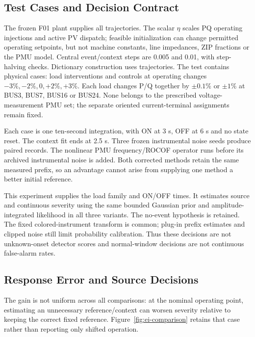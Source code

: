 \subsection{Test Cases and Decision Contract}
The frozen F01 plant supplies all trajectories. The scalar $\eta$ scales
PQ operating injections and active PV dispatch; feasible initialization
can change permitted operating setpoints, but not machine constants,
line impedances, ZIP fractions or the PMU model. Central event/context
steps are 0.005 and 0.01, with step-halving checks. Dictionary construction
uses \EIDictionaryCases{} trajectories. The test contains \EITestPhysical{}
physical cases: \EIEventPhysical{} load interventions and \EINormalPhysical{}
controls at operating changes $-3\%,-2\%,0,+2\%,+3\%$. Each load changes
P/Q together by $\pm0.1\%$ or $\pm1\%$ at BUS3, BUS7, BUS16 or BUS24.
None belongs to the prescribed voltage-measurement PMU set; the separate
oriented current-terminal assignments remain fixed.

Each case is one ten-second integration, with ON at 3 s, OFF at 6 s and
no state reset. The context fit ends at 2.5 s. Three frozen instrumental
noise seeds produce \EIObserved{} paired records. The nonlinear PMU
frequency/ROCOF operator runs before its archived instrumental noise is
added. Both corrected methods retain the same measured prefix, so an
advantage cannot arise from supplying one method a better initial reference.\AIDraftingCredit{}

This experiment supplies the load family and ON/OFF times. It estimates
source and continuous severity using the same bounded Gaussian prior and
amplitude-integrated likelihood in all three variants. The no-event
hypothesis is retained. The fixed colored-instrument transform is common;
plug-in prefix estimates and clipped noise still limit probability
calibration. Thus these decisions are not unknown-onset detector scores
and normal-window decisions are not continuous false-alarm rates.

\subsection{Response Error and Source Decisions}



The gain is not uniform across all comparisons: at the nominal operating
point, estimating an unnecessary reference/context can worsen severity
relative to keeping the correct fixed reference. Figure~\ref{fig:ei-comparison}
retains that case rather than reporting only shifted operation.

